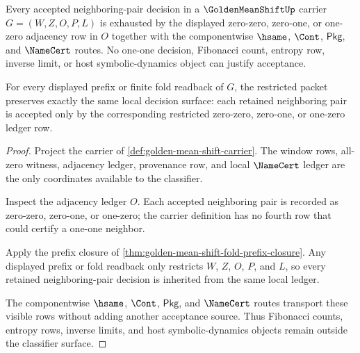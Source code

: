 \begin{theorem}
\label{thm:golden-mean-shift-adjacency-ledger-exhaustion}
Every accepted neighboring-pair decision in a $\GoldenMeanShiftUp$ carrier $G=(W,Z,O,P,L)$ is exhausted by the displayed zero-zero, zero-one, or one-zero adjacency row in $O$ together with the componentwise $\hsame$, $\Cont$, $\mathsf{Pkg}$, and $\NameCert$ routes. No one-one decision, Fibonacci count, entropy row, inverse limit, or host symbolic-dynamics object can justify acceptance.

For every displayed prefix or finite fold readback of $G$, the restricted packet preserves exactly the same local decision surface: each retained neighboring pair is accepted only by the corresponding restricted zero-zero, zero-one, or one-zero ledger row.
\end{theorem}
\begin{proof}
Project the carrier of \autoref{def:golden-mean-shift-carrier}. The window rows, all-zero witness, adjacency ledger, provenance row, and local $\NameCert$ ledger are the only coordinates available to the classifier.

Inspect the adjacency ledger $O$. Each accepted neighboring pair is recorded as zero-zero, zero-one, or one-zero; the carrier definition has no fourth row that could certify a one-one neighbor.

Apply the prefix closure of \autoref{thm:golden-mean-shift-fold-prefix-closure}. Any displayed prefix or fold readback only restricts $W$, $Z$, $O$, $P$, and $L$, so every retained neighboring-pair decision is inherited from the same local ledger.

The componentwise $\hsame$, $\Cont$, $\mathsf{Pkg}$, and $\NameCert$ routes transport these visible rows without adding another acceptance source. Thus Fibonacci counts, entropy rows, inverse limits, and host symbolic-dynamics objects remain outside the classifier surface.
\end{proof}

